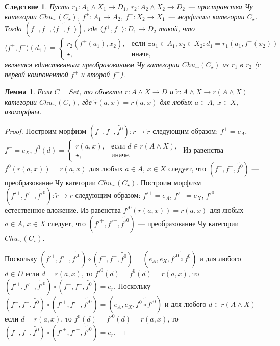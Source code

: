 \documentclass[a4paper,12pt]{article}
\newtheorem{lemma}{Лемма}
\newtheorem{consequence}{Следствие}
\begin{document}
\begin{consequence}\label{unique-third}
    Пусть $r_1: A_1 \wedge X_1 \to D_1$, $r_2: A_2 \wedge X_2 \to D_2$ --- пространства Чу категории $Chu_\sim(C_\star)$, $f^+: A_1 \to A_2$, $f^-: X_2 \to X_1$ --- морфизмы категории $C_\star$. Тогда $(f^+,f^-,\widetilde{\langle f^+,f^- \rangle})$, где $\langle f^+,f^- \rangle: D_1 \to D_2$ такой, что $$\langle f^+,f^- \rangle(d_1) = 
    \begin{cases}
        r_2(f^+(a_1),x_2),& \text{если } \exists a_1 \in A_1, x_2 \in X_2: d_1 = r_1(a_1,f^-(x_2))\\
        \star,& \text{иначе,}
    \end{cases}$$ является единственным преобразованием Чу категории $Chu_\sim(C_\star)$ из $r_1$ в $r_2$ (с первой компонентой $f^+$ и второй $f^-$).
\end{consequence}

\begin{lemma}\label{iso-c}
    Если $C = Set$, то объекты $r: A \wedge X \to D$ и $\tilde{r}: A \wedge X \to r(A \wedge X)$ категории $Chu_\sim(C_\star)$, где $\tilde{r}(a,x) = r(a,x)$ для любых $a \in A$, $x \in X$, изоморфны.
\end{lemma}
\begin{proof}
    Построим морфизм $(f^+,f^-,\widetilde{f^0}): r \to \tilde{r}$ следующим образом: $f^+ = e_A$, $f^- = e_X$, $f^0(d) = 
    \begin{cases}
        r(a,x),& \text{если } d \in r(A \wedge X),\\
        \star,& \text{иначе}.
    \end{cases}$
    Из равенства $f^0(r(a,x)) = r(a,x)$ для любых $a \in A$, $x \in X$ следует, что $(f^+,f^-,\widetilde{f^0})$ --- преобразование Чу категории $Chu_\sim(C_\star)$. Построим морфизм $(f'^+,f'^-,\widetilde{f'^0}): \tilde{r} \to r$ следующим образом: $f'^+ = e_A$, $f'^- = e_X$, $f'^0$ --- естественное вложение. Из равенства $f'^0(r(a,x)) = r(a,x)$ для любых $a \in A$, $x \in X$ следует, что $(f'^+,f'^-,\widetilde{f'^0})$ --- преобразование Чу категории $Chu_\sim(C_\star)$.

    Поскольку $(f'^+,f'^-,\widetilde{f'^0}) \circ (f^+,f^-,\widetilde{f^0}) = (e_A,e_X,\widetilde{f'^0 \circ f^0})$ и для любого $d \in D$ если $d = r(a,x)$, то $f'^0(d) = f^0(d) = r(a,x)$, то $(f'^+,f'^-,\widetilde{f'^0}) \circ (f^+,f^-,\widetilde{f^0}) = e_r$. Поскольку $(f^+,f^-,\widetilde{f^0}) \circ (f'^+,f'^-,\widetilde{f'^0}) = (e_A,e_X,\widetilde{f^0 \circ f'^0})$ и для любого $d \in r(A \wedge X)$ если $d = r(a,x)$, то $f^0(d) = f'^0(d) = r(a,x)$, то $(f^+,f^-,\widetilde{f^0}) \circ (f'^+,f'^-,\widetilde{f'^0}) = e_{\tilde{r}}$.
\end{proof}
\end{document}
